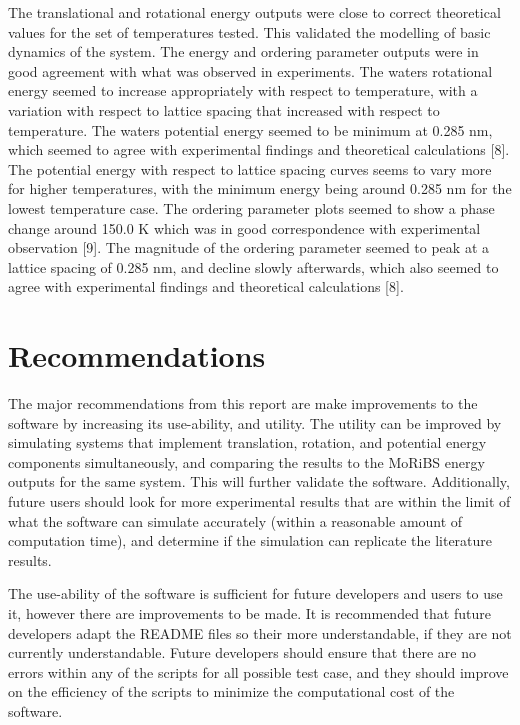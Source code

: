 \documentclass{ece}
\begin{document}
The translational and rotational energy outputs were close to correct theoretical values for the set of temperatures tested. This validated the modelling of basic dynamics of the system. The energy and ordering parameter outputs were in good agreement with what was observed in experiments. The waters rotational energy seemed to increase appropriately with respect to temperature, with a variation with respect to lattice spacing that increased with respect to temperature. The waters potential energy seemed to be minimum at 0.285 nm, which seemed to agree with experimental findings and theoretical calculations [8]. The potential energy with respect to lattice spacing curves seems to vary more for higher temperatures, with the minimum energy being around 0.285 nm for the lowest temperature case. The ordering parameter plots seemed to show a phase change around 150.0 K which was in good correspondence with experimental observation [9]. The magnitude of the ordering parameter seemed to peak at a lattice spacing of 0.285 nm, and decline slowly afterwards, which also seemed to agree with experimental findings and theoretical calculations [8]. 

\section*{Recommendations}

The major recommendations from this report are make improvements to the software by increasing its use-ability, and utility. The utility can be improved by simulating systems that implement translation, rotation, and potential energy components simultaneously, and comparing the results to the \gls{MoRiBS} energy outputs for the same system. This will further validate the software. Additionally, future users should look for more experimental results that are within the limit of what the software can simulate accurately (within a reasonable amount of computation time), and determine if the simulation can replicate the literature results. 

The use-ability of the software is sufficient for future developers and users to use it, however there are improvements to be made. It is recommended that future developers adapt the README files so their more understandable, if they are not currently understandable. Future developers should ensure that there are no errors within any of the scripts for all possible test case, and they should improve on the efficiency of the scripts to minimize the computational cost of the software. 
\end{document}
